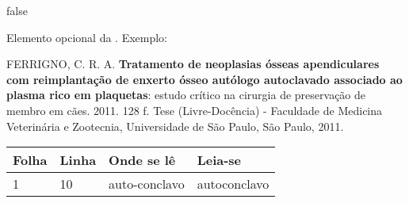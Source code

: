 \documentclass[
	12pt,				%
	openright,		nsubseteq	%
	twoside,			%
	a4paper,			%
	english,			%
	french,				%
	spanish,			%
	brazil				%
	]{abntex2}
\begin{document}
\if false
\begin{errata}
Elemento opcional da . Exemplo:

\vspace{\onelineskip}

FERRIGNO, C. R. A. \textbf{Tratamento de neoplasias ósseas apendiculares com
reimplantação de enxerto ósseo autólogo autoclavado associado ao plasma
rico em plaquetas}: estudo crítico na cirurgia de preservação de membro em
cães. 2011. 128 f. Tese (Livre-Docência) - Faculdade de Medicina Veterinária e
Zootecnia, Universidade de São Paulo, São Paulo, 2011.

\begin{table}[htb]
\center
\footnotesize
\begin{tabular}{|p{1.4cm}|p{1cm}|p{3cm}|p{3cm}|}
  \hline
   \textbf{Folha} & \textbf{Linha}  & \textbf{Onde se lê}  & \textbf{Leia-se}  \\
    \hline
    1 & 10 & auto-conclavo & autoconclavo\\
   \hline
\end{tabular}
\end{table}

\end{errata}
\fi

\end{document}

